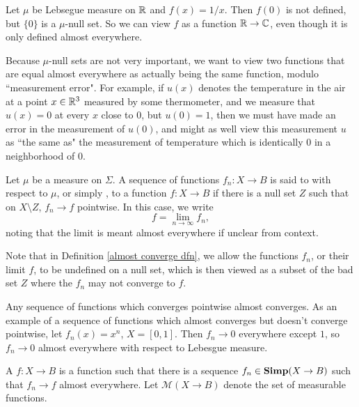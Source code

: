 \begin{example}
Let $\mu$ be Lebsegue measure on $\mathbb{R}$ and $f(x) = 1/x$.
Then $f(0)$ is not defined, but $\{0\}$ is a $\mu$-null set.
So we can view $f$ as a function $\mathbb{R} \to \mathbb{C}$, even though it is only defined almost everywhere.
\end{example}

\begin{subsec}
Because $\mu$-null sets are not very important, we want to view two functions that are equal almost everywhere as actually being the same function, modulo ``measurement error".
For example, if $u(x)$ denotes the temperature in the air at a point $x \in \mathbb{R}^3$ measured by some thermometer, and we measure that $u(x) = 0$ at every $x$ close to $0$, but $u(0) = 1$, then we must have made an error in the measurement of $u(0)$, and might as well view this measurement $u$ as ``the same as" the measurement of temperature which is identically $0$ in a neighborhood of $0$.
\end{subsec}

\begin{definition}
\label{almost converge dfn}
Let $\mu$ be a measure on $\Sigma$. A sequence of functions $f_n: X \to B$ is said to  with respect to $\mu$, or simply , to a function $f: X \to B$ if there is a null set $Z$ such that on $X \setminus Z$, $f_n \to f$ pointwise. In this case, we write
$$f = \lim_{n \to \infty} f_n,$$
noting that the limit is meant almost everywhere if unclear from context.
\end{definition}

\begin{subsec}
Note that in Definition \ref{almost converge dfn}, we allow the functions $f_n$, or their limit $f$, to be undefined on a null set, which is then viewed as a subset of the bad set $Z$ where the $f_n$ may not converge to $f$.
\end{subsec}

\begin{example}
Any sequence of functions which converges pointwise almost converges.
As an example of a sequence of functions which almost converges but doesn't converge pointwise, let $f_n(x) = x^n$, $X = [0, 1]$. Then $f_n \to 0$ everywhere except $1$, so $f_n \to 0$ almost everywhere with respect to Lebesgue measure.
\end{example}

\begin{definition}
A  $f: X \to B$ is a function such that there is a sequence $f_n \in \mathbf{Simp}(X \to B)$ such that $f_n \to f$ almost everywhere.
Let $\mathcal M(X \to B)$ denote the set of measurable functions.
\end{definition}


